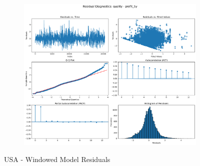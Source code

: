 \documentclass[11pt,english,a4paper,hidelinks]{book}
\begin{document}
\begin{figure}[H]
\begin{subfigure}[b]{0.32\textwidth}
    \end{subfigure}
    \hfill
    \begin{subfigure}[b]{0.32\textwidth}
        \centering
        \includegraphics[width=\textwidth]{images/code/models/linear_regression/third_model/USA/quality_profit_5y_residuals.png}
    \end{subfigure}
    \caption{USA - Windowed Model Residuals}
    \label{fig:linear_regression_USA_residues_windowed}
\end{figure}
\end{document}
